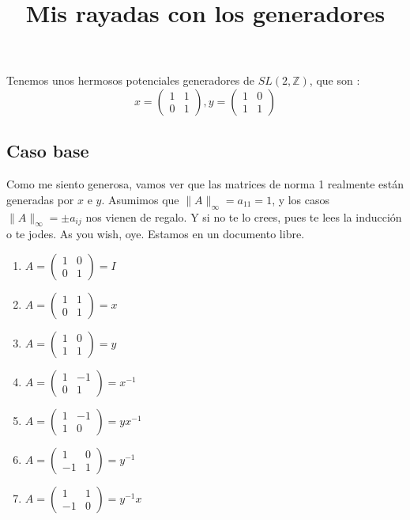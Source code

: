 \documentclass{article}
\title{Mis rayadas con los generadores}
\date{}
\newcommand\tab[1][0.6cm]{\hspace*{#1}}
\newcommand\nl{\newline\tab}
\begin{document}
	\maketitle
	Tenemos unos hermosos potenciales generadores de $ SL(2, \mathbb{Z}) $, que son : 
	$$
	x = 
	\begin{pmatrix}
	1 & 1 \\
	0 & 1 
	\end{pmatrix},	
	y = 
	\begin{pmatrix}
	1 & 0 \\
	1 & 1 
	\end{pmatrix}
	$$
	
	\subsection{Caso base}
	\tab Como me siento generosa, vamos ver que las matrices de norma 1 realmente están generadas por $x$ e $y$.\nl 
	Asumimos que $\|A\|_\infty = a_{11} = 1$, y los casos $\|A\|_\infty = \pm a_{ij}$ nos vienen de regalo. Y si no te lo crees, pues te lees la inducción o te jodes. As you wish, oye. Estamos en un documento libre.
	\begin{enumerate}
		\item
		$
		A = 
		\begin{pmatrix}
		1 & 0 \\
		0 & 1 
		\end{pmatrix} 
		= I
		$
		\item
		$
		A = 
		\begin{pmatrix}
		1 & 1 \\
		0 & 1 
		\end{pmatrix} 
		= x
		$
		\item
		$
		A = 
		\begin{pmatrix}
		1 & 0 \\
		1 & 1 
		\end{pmatrix} 
		= y
		$
		\item
		$
		A = 
		\begin{pmatrix}
		1 & -1 \\
		0 & 1 
		\end{pmatrix} 
		= x^{-1}
		$
		\item
		$
		A = 
		\begin{pmatrix}
		1 & -1 \\
		1 & 0 
		\end{pmatrix} 
		= yx^{-1}
		$			
		\item
		$
		A = 
		\begin{pmatrix}
		1 & 0 \\
		-1 & 1 
		\end{pmatrix} 
		= y^{-1}
		$
		\item
		$
		A = 
		\begin{pmatrix}
		1 & 1 \\
		-1 & 0 			
		\end{pmatrix} 
		= y^{-1}x			
		$					
		
	\end{enumerate}
	
\end{document}
